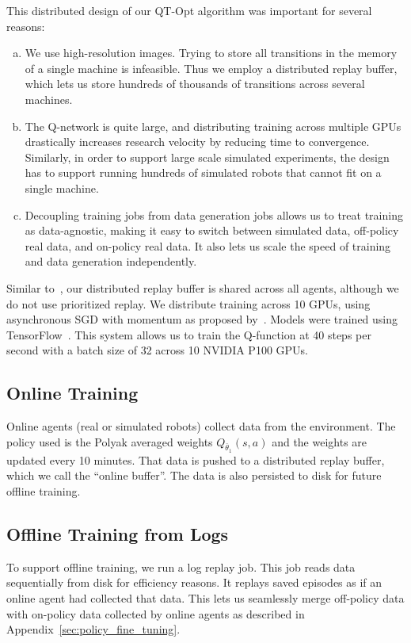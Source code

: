 \documentclass{article}
\begin{document}
This distributed design of our QT-Opt algorithm was important for several reasons: 
\begin{enumerate}[(a)]
\item %
We use high-resolution images. Trying to store all transitions in the memory of a single machine is infeasible. Thus we employ a distributed replay buffer, which lets us store hundreds of thousands of transitions across several machines.
\item %
The Q-network is quite large, and distributing training across multiple GPUs drastically increases research velocity by reducing time to convergence. Similarly, in order to support large scale simulated experiments, the design has to support running hundreds of simulated robots that cannot fit on a single machine.
\item %
Decoupling training jobs from data generation jobs allows us to treat training as data-agnostic, making it easy to switch between simulated data, off-policy real data, and on-policy real data. It also lets us scale the speed of training and data generation independently.
\end{enumerate}

Similar to~\citep{horgan2018distributed}, our distributed replay buffer is shared across all agents, although we do not use prioritized replay. 
We distribute training across 10 GPUs, using asynchronous SGD with momentum as proposed by~\citep{dean_async}. Models were trained using  TensorFlow~\citep{tensorflow2015-whitepaper}. This system allows us to train the Q-function at 40 steps per second with a batch size of 32 across 10 NVIDIA P100 GPUs.

\subsection{Online Training}\label{sec:online-training}

Online agents (real or simulated robots) collect data from the environment. The policy used is the Polyak averaged weights $Q_{\bar{\theta}_1}(s,a)$ and the weights are updated every 10 minutes. That data is pushed to a distributed replay buffer, which we call the \enquote{online buffer}. The data is also persisted to disk for future offline training.

\subsection{Offline Training from Logs}

To support offline training, we run a log replay job. This job reads data sequentially from disk for efficiency reasons. It replays saved episodes as if an online agent had collected that data. This lets us seamlessly merge off-policy data with on-policy data collected by online agents as described in Appendix~\ref{sec:policy_fine_tuning}.
\end{document}
